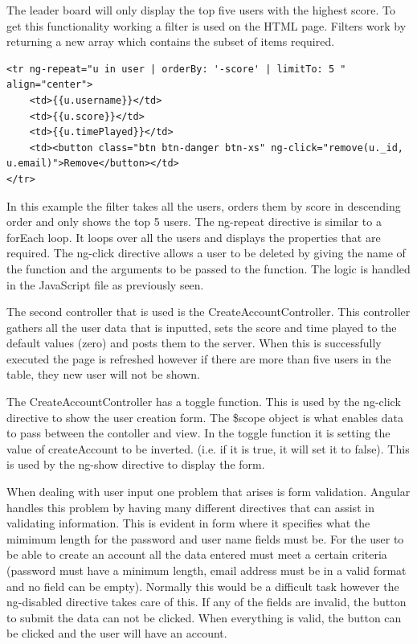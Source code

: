 \documentclass[12pt]{article}
\begin{document}
The leader board will only display the top five users with the highest score. To get this functionality working a filter is used on the HTML page. Filters work by returning a new array which contains the subset of items required.


\begin{lstlisting}
<tr ng-repeat="u in user | orderBy: '-score' | limitTo: 5 " align="center">
	<td>{{u.username}}</td>
	<td>{{u.score}}</td>
	<td>{{u.timePlayed}}</td>
	<td><button class="btn btn-danger btn-xs" ng-click="remove(u._id, 						u.email)">Remove</button></td>
</tr>
\end{lstlisting}

In this example the filter takes all the users, orders them by score in descending order and only shows the top 5 users. The ng-repeat directive is similar to a forEach loop. It loops over all the users and displays the properties that are required. The ng-click directive allows a user to be deleted by giving the name of the function and the arguments to be passed to the function. The logic is handled in the JavaScript file as previously seen. 

The second controller that is used is the CreateAccountController. This controller gathers all the user data that is inputted, sets the score and time played to the default values (zero) and posts them to the server. When this is successfully executed the page is refreshed however if there are more than five users in the table, they new user will not be shown. 

The CreateAccountController has a toggle function. This is used by the ng-click directive to show the user creation form. The {\$}scope object is what enables data to pass between the contoller and view. In the toggle function it is setting the value of createAccount to be inverted. (i.e. if it is true, it will set it to false). This is used by the ng-show directive to display the form.

When dealing with user input one problem that arises is form validation. Angular handles this problem by having many different directives that can assist in validating information. This is evident in form where it specifies what the mimimum length for the password and user name fields must be. For the user to be able to create an account all the data entered must meet a certain criteria (password must have a minimum length, email address must be in a valid format and no field can be empty). Normally this would be a difficult task however the ng-disabled directive takes care of this. If any of the fields are invalid, the button to submit the data can not be clicked. When everything is valid, the button can be clicked and the user will have an account. 
\end{document}
